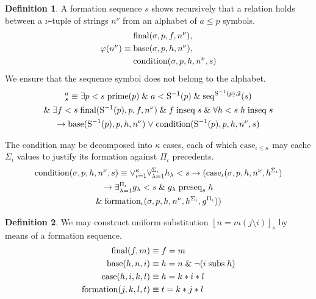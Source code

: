\documentclass{amsbook}
\newcommand{\univ}[1]{\mathord\forall#1\;}
\newcommand{\exis}[1]{\mathord\exists#1\;}
\newcommand{\then}{\mathrel\rightarrow}
\newcommand{\conj}{\mathrel\&}
\newcommand{\disj}{\mathrel\vee}
\theoremstyle{definition}
\newtheorem{dfn}{Definition}[section]
\begin{document}
\begin{dfn}
    A formation sequence $s$ shows recursively that a relation holds between a $\nu$-tuple of strings $n^\nu$ from an alphabet of $a \leq p$ symbols.
    $$
        \varphi(n^\nu) \equiv \begin{aligned}
             & \mathrm{final}(\sigma, p, f, n^\nu),       \\
             & \mathrm{base}(\sigma, p, h, n^\nu),        \\
             & \mathrm{condition}(\sigma, p, h, n^\nu, s)
        \end{aligned}
    $$
    We ensure that the sequence symbol does not belong to the alphabet.
    \begin{gather*}
        [\varphi(n^\nu)]_s^a \equiv \exis{p < s} \prim(p) \conj a < \suc^{-1}(p) \conj \mathrm{seq}^{\suc^{-1}(p), 2}(s) \\
        \conj \exis{f < s} \final(\suc^{-1}(p), p, f, n^\nu) \conj f \inseq s \conj \univ{h < s} h \inseq s                                                                    \\
        \then \base(\suc^{-1}(p), p, h, n^\nu) \disj \condition(\suc^{-1}(p), p, h, n^\nu, s)
    \end{gather*}

    The condition may be decomposed into $\kappa$ cases, each of which $\mathrm{case}_{\iota\leq\kappa}$ may cache $\Sigma_\iota$ values to justify its formation against $\Pi_\iota$ precedents.
    \begin{gather*}
        \condition(\sigma, p, h, n^\nu, s) \equiv \mathord\vee_{\iota=1}^{\kappa} \forall_{\lambda = 1}^{\Sigma_\iota} h_\lambda < s \then (\mathrm{case}_\iota(\sigma, p, h, n^\nu, h^{\Sigma_\iota})\\
        \then \exists_{\lambda = 1}^{\Pi_\iota}{g_\lambda < s} \conj g_\lambda \preseq_s h\\
        \conj \mathrm{formation}_\iota(\sigma, p, h, n^\nu, h^{\Sigma_\iota}, g^{\Pi_\iota}))
    \end{gather*}
\end{dfn}

\begin{dfn}
    We may construct uniform substitution $[n = m(j \setminus i)]_s$ by means of a formation sequence.
    \begin{align*}
        \mathrm{final}(f, m) \equiv\;           & f = m                       \\
        \mathrm{base}(h, n, i) \equiv\;         & h = n \conj \neg(i \subs h) \\
        \mathrm{case}(h, i, k, l) \equiv\;      & h = k * i * l               \\
        \mathrm{formation}(j, k, l, t) \equiv\; & t = k * j * l
    \end{align*}
\end{dfn}
\end{document}
